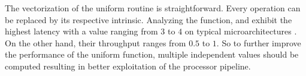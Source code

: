 \documentclass{stdlocal}
\begin{document}
    \newpage
    \noindent
    The vectorization of the uniform routine is straightforward.
    Every operation can be replaced by its respective intrinsic.
    Analyzing the function,  and  exhibit the highest latency with a value ranging from $3$ to $4$ on typical microarchitectures \autocite{intel-intrinsics-guide,fog2019d}.
    On the other hand, their throughput ranges from $0.5$ to $1$.
    So to further improve the performance of the uniform function, multiple independent values should be computed resulting in better exploitation of the processor pipeline.




\end{document}
